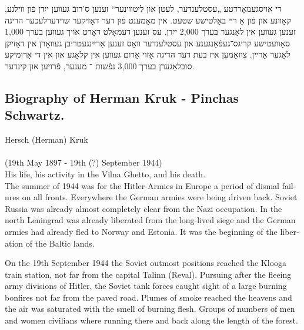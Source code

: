 \documentclass{article}
\begin{document}
\begin{pairs}
\begin{Rightside}
\begin{RTL}
\begin{hebrew}
די אויסגעמאָרדטע „עסטלענדער, לעטן און ליטװינער“ זענען ס'רובֿ געװען
ייִדן פֿון װילנע, קאָװנע און פֿון אַ רײ באַלטישע שטעט. אין מאָמענט פֿוּן דער
דאָזיקער שוידערלעכער הריגה זענען געװען אין לאַנגער בערך 2,000 ייִדן. עס
זענען דעמאָלט דאָרט אויך געװען בערך 1,000 סאָװעטישע קריגס־געפֿאַנגענע און
עסטלענדער װאָס זענען אַרײַנגעטריבן געװאָרן אין דאָזיקן לאַגער אַרײַן.
צוזאַמען איז בעת דער הריגה אַזוי אַרום געװען אין קלאָגע און אין די אַרומיקע
סובלאַגערן בערך 3,000 נפֿשות ־ מענער, פֿרויען און קינדער.

\endnumbering
\end{hebrew}
\end{RTL}
\end{Rightside}


\begin{Leftside}
\begin{english}
\section{
Biography of Herman Kruk - Pinchas Schwartz. \\    }
\beginnumbering
\autopar

Hersch (Herman) Kruk \\ \\ (19th May 1897 - 19th (?) September 1944) \\ 

His life, his activity in the Vilna Ghetto, and his death. \\

The summer of 1944 was for the Hitler-Armies in Europe a period
of dismal failures on all fronts. Everywhere the German armies 
were being driven back. Soviet Russia was already almost completely
clear from the Nazi occupation. In the north Leningrad was already
liberated from the long-lived siege and the German armies had already
fled to Norway and Estonia. It was the beginning of the liberation of the Baltic
lands.

On the 19th September 1944 the Soviet outmost positions reached the Klooga train station,
not far from the capital Talinn (Reval). Pursuing after the fleeing army divisions of Hitler, the
Soviet tank forces caught sight of a large burning bonfires not far from the paved road.  Plumes
of smoke reached the heavens and the air was saturated with the smell of burning flesh. Groups of numbers of
men and women civilians where running there and back along the length of the forest.


\end{english}
\end{Leftside}
\end{pairs}
\end{document}
